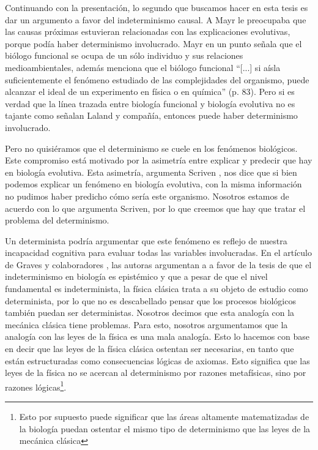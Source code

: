 Continuando con la presentación, lo segundo que buscamos hacer en esta tesis es dar un argumento a favor del indeterminismo causal. A Mayr le preocupaba que las causas próximas estuvieran relacionadas con las explicaciones evolutivas, porque podía haber determinismo involucrado. Mayr \cite{Mayr1998} en un punto señala que el biólogo funcional se ocupa de un sólo individuo y sus relaciones medioambientales, además menciona que el biólogo funcional ``[...] si aísla suficientemente el fenómeno estudiado de las complejidades del organismo, puede alcanzar el ideal de un experimento en física o en química'' (p. 83). Pero si es verdad que la línea trazada entre biología funcional y biología evolutiva no es tajante como señalan Laland y compañía, entonces puede haber determinismo involucrado.

Pero no quisiéramos que el determinismo se cuele en los fenómenos biológicos. Este compromiso está motivado por la asimetría entre explicar y predecir que hay en biología evolutiva. Esta asimetría, argumenta Scriven \citeyear{Scriven1959}, nos dice que si bien podemos explicar un fenómeno en biología evolutiva, con la misma información no pudimos haber predicho cómo sería este organismo. Nosotros estamos de acuerdo con lo que argumenta Scriven, por lo que creemos que hay que tratar el problema del determinismo.

Un determinista podría argumentar que este fenómeno es reflejo de nuestra incapacidad cognitiva para evaluar todas las variables involucradas. En el artículo de Graves y colaboradores \citeyear{Graves1999}, las autoras argumentan a a favor de la tesis de que el indeterminismo en biología es epistémico y que a pesar de que el nivel fundamental es indeterminista, la física clásica trata  a su objeto de estudio como determinista, por lo que no es descabellado pensar que los procesos biológicos también puedan ser deterministas. Nosotros decimos que esta analogía con la mecánica clásica tiene problemas. Para esto, nosotros argumentamos que la analogía con las leyes de la física es una mala analogía. Esto lo hacemos con base en decir que las leyes de la física clásica ostentan ser necesarias, en tanto que están estructuradas como consecuencias lógicas de axiomas. Esto significa que las leyes de la física no se acercan al determinismo por razones metafísicas, sino por razones lógicas\footnote{Esto por supuesto puede significar que las áreas altamente matematizadas de la biología puedan ostentar el mismo tipo de determinismo que las leyes de la mecánica clásica}.


